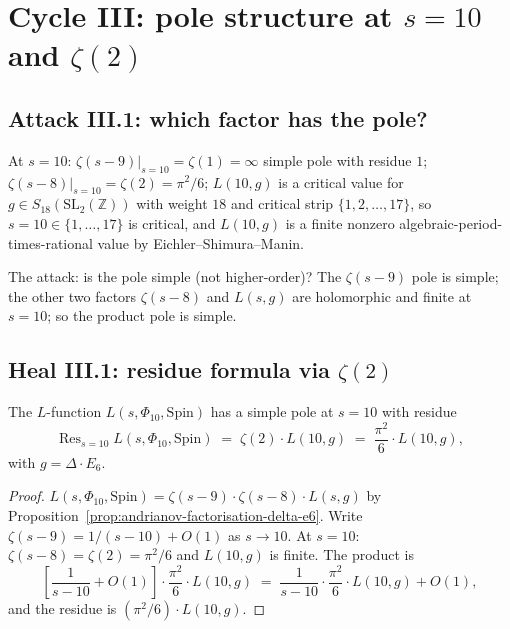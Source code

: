 
\section{Cycle III: pole structure at $s = 10$ and $\zeta(2)$}
\label{sec:cycle-3-pole-structure}

\subsection*{Attack III.1: which factor has the pole?}

At $s = 10$: $\zeta(s - 9)|_{s = 10} = \zeta(1) = \infty$ simple pole
with residue $1$; $\zeta(s - 8)|_{s = 10} = \zeta(2) = \pi^2/6$;
$L(10, g)$ is a critical value for $g \in S_{18}(\mathrm{SL}_2(\mathbb{Z}))$
with weight $18$ and critical strip $\{1, 2, \ldots, 17\}$, so
$s = 10 \in \{1, \ldots, 17\}$ is critical, and $L(10, g)$ is a
finite nonzero algebraic-period-times-rational value by
Eichler--Shimura--Manin.

The attack: is the pole simple (not higher-order)?  The $\zeta(s - 9)$
pole is simple; the other two factors $\zeta(s - 8)$ and $L(s, g)$
are holomorphic and finite at $s = 10$; so the product pole is
simple.

\subsection*{Heal III.1: residue formula via $\zeta(2)$}

\begin{proposition}
\label{prop:residue-zeta2-L10}
The $L$-function $L(s, \Phi_{10}, \mathrm{Spin})$ has a simple pole
at $s = 10$ with residue
\[
 \operatorname{Res}_{s = 10} L(s, \Phi_{10}, \mathrm{Spin}) \;=\; \zeta(2)
 \cdot L(10, g) \;=\; \frac{\pi^2}{6} \cdot L(10, g),
\]
with $g = \Delta \cdot E_6$.
\end{proposition}

\begin{proof}
$L(s, \Phi_{10}, \mathrm{Spin}) = \zeta(s - 9) \cdot \zeta(s - 8)
\cdot L(s, g)$ by Proposition~\ref{prop:andrianov-factorisation-delta-e6}.
Write $\zeta(s - 9) = 1/(s - 10) + O(1)$ as $s \to 10$.  At $s = 10$:
$\zeta(s - 8) = \zeta(2) = \pi^2/6$ and $L(10, g)$ is finite.  The
product is
\[
 \left[\frac{1}{s - 10} + O(1)\right] \cdot \frac{\pi^2}{6} \cdot
 L(10, g) \;=\; \frac{1}{s - 10} \cdot \frac{\pi^2}{6} \cdot L(10, g)
 + O(1),
\]
and the residue is $(\pi^2/6) \cdot L(10, g)$.
\end{proof}

